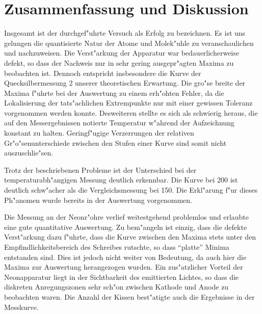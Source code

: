 \documentclass[a4paper,10pt]{article}
\begin{document}
\section{Zusammenfassung und Diskussion}
Insgesamt ist der durchgef"uhrte Versuch als Erfolg zu bezeichnen. Es ist uns gelungen die quantisierte Natur der Atome und Molek"uhle zu veranschaulichen und nachzuweisen. Die Verst"arkung der Apparatur war bedauerlicherweise defekt, so dass der Nachweis nur in sehr gering ausgepr"agten Maxima zu beobachten ist. Dennoch entspricht insbesondere die Kurve der Quecksilbermessung 2 unserer theoretischen Erwartung. Die gro"se breite der Maxima f"uhrte bei der Auswertung zu einem erh"ohten Fehler, da die Lokalisierung der tats"achlichen Extrempunkte nur mit einer gewissen Toleranz vorgenommen werden konnte. Desweiteren stellte es sich als schwierig heraus, die auf den Messergebnissen notierte Temperatur w"ahrend der Aufzeichnung konstant zu halten. Geringf"ugige Verzerrungen der relativen Gr"o"senunterschiede zwischen den Stufen einer Kurve sind somit nicht auszuschlie"sen.

Trotz der beschriebenen Probleme ist der Unterschied bei der temperaturabh"angigen Messung deutlich erkennbar. Die Kurve bei \unit{200}{\celsius} ist deutlich schw"acher als die Vergleichsmessung bei \unit{150}{\celsius}. Die Erkl"arung f"ur dieses Ph"anomen wurde bereits in der Auswertung vorgenommen. 

Die Messung an der Neonr"ohre verlief weitestgehend problemlos und erlaubte eine gute quantitative Auswertung. Zu bem"angeln ist einzig, dass die defekte Verst"arkung dazu f"uhrte, dass die Kurve zwischen den Maxima stets unter den Empfindlichkeitsbereich des Schreibes rutschte, so dass "`platte"' Minima entstanden sind. Dies ist jedoch nicht weiter von Bedeutung, da auch hier die Maxima zur Auswertung herangezogen wurden. Ein zus"atzlicher Vorteil der Neonapparatur liegt in der Sichtbarkeit des emittierten Lichtes, so dass die diskreten Anregungszonen sehr sch"on zwischen Kathode und Anode zu beobachten waren. Die Anzahl der Kissen best"atigte auch die Ergebnisse in der Messkurve.
\end{document}
